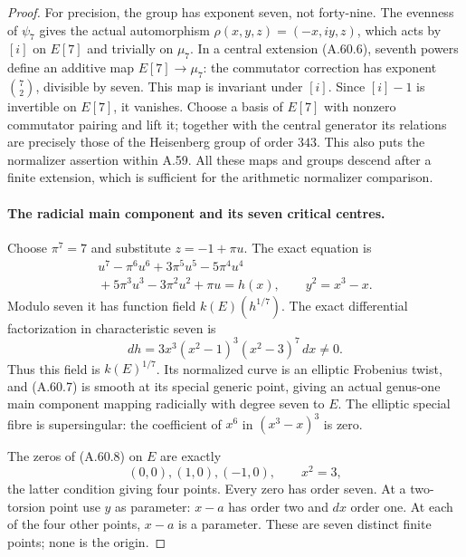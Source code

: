 \begin{proof}
For precision, the group has exponent seven, not
forty-nine. The evenness of \(\psi _7\) gives the actual
automorphism \(\rho(x,y,z)=(-x,iy,z)\), which acts by
\([i]\) on \(E[7]\) and trivially on \(\mu _7\).
In a central extension (A.60.6), seventh powers define
an additive map \(E[7]\to\mu _7\): the commutator
correction has exponent \(\binom72\), divisible by
seven. This map is invariant under \([i]\). Since
\([i]-1\) is invertible on \(E[7]\), it vanishes.
Choose a basis of \(E[7]\) with nonzero commutator
pairing and lift it; together with the central generator
its relations are precisely those of the Heisenberg
group of order \(343\). This also puts the normalizer
assertion within A.59. All these maps and groups descend
after a finite extension, which is sufficient for the
arithmetic normalizer comparison.

\paragraph{The radicial main component and its seven critical centres.}
Choose \(\pi^7=7\) and substitute \(z=-1+\pi u\).
The exact equation is
\[
 \begin{gathered}
 u^7-\pi^6u^6+3\pi^5u^5-5\pi^4u^4\\
             {}+5\pi^3u^3-3\pi^2u^2+\pi u=h(x),
                \qquad y^2=x^3-x.
 \end{gathered}                     \tag{A.60.7}
\]
Modulo seven it has function field \(k(E)(h^{1/7})\).
The exact differential factorization in characteristic seven is
\[
                   dh=3x^3(x^2-1)^3(x^2-3)^7\,dx\ne0.
                                                        \tag{A.60.8}
\]
Thus this field is \(k(E)^{1/7}\). Its normalized curve
is an elliptic Frobenius twist, and (A.60.7) is smooth
at its special generic point, giving an actual
genus-one main component mapping radicially with degree
seven to \(E\). The elliptic special fibre is
supersingular: the coefficient of \(x^6\) in
\((x^3-x)^3\) is zero.

The zeros of (A.60.8) on \(E\) are exactly
\[
                (0,0),(1,0),(-1,0),
                            \qquad x^2=3,              \tag{A.60.9}
\]
the latter condition giving four points. Every zero
has order seven. At a two-torsion point use \(y\)
as parameter: \(x-a\) has order two and \(dx\)
order one. At each of the four other points, \(x-a\)
is a parameter. These are seven distinct finite points;
none is the origin.


\end{proof}
